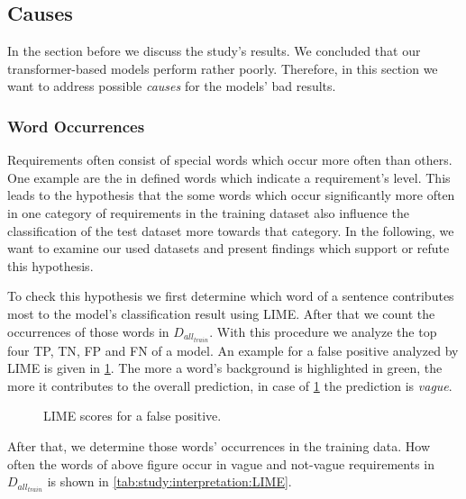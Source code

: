 \subsection{Causes}
\label{chp:study:sec:interpretation:subsec:causes}
In the section before we discuss the study's results.
We concluded that our transformer-based models perform rather poorly.
Therefore, in this section we want to address possible \textit{causes} for the models' bad results.

\subsubsection{Word Occurrences}
\label{chp:study:sec:interpretation:subsec:causes:word_occurrences}
Requirements often consist of special words which occur more often than others.
One example are the in \textcite{Bradner:1997} defined words which indicate a requirement's level.
This leads to the hypothesis that the some words which occur significantly more often in one category of requirements in the training dataset also influence the classification of the test dataset more towards that category.
In the following, we want to examine our used datasets and present findings which support or refute this hypothesis.

To check this hypothesis we first determine which word of a sentence contributes most to the model's classification result using \ac{LIME}.
After that we count the occurrences of those words in $D_{all_{train}}$.
With this procedure we analyze the top four \ac{TP}, \ac{TN}, \ac{FP} and \ac{FN} of a model.
An example for a false positive analyzed by \ac{LIME} is given in \cref{fig:study:interpretation:LIME}.
The more a word's background is highlighted in green, the more it contributes to the overall prediction, in case of \cref{fig:study:interpretation:LIME} the prediction is \textit{vague}.
\newpage %
\begin{figure}[htpb]
    \centering
    \def\svgwidth{\columnwidth}
    
    \caption[Study Interpretation: Example for LIME]{LIME scores for a false positive.}\label{fig:study:interpretation:LIME}
\end{figure}

After that, we determine those words' occurrences in the training data.
How often the words of above figure occur in vague and not-vague requirements in $D_{all_{train}}$ is shown in \cref{tab:study:interpretation:LIME}.

